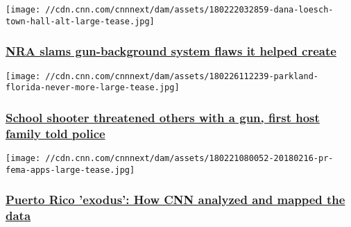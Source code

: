 \href{/2018/02/23/us/nra-criticizes-gaps-it-created-in-gun-background-system-invs/index.html}{}

\texttt{[image: //cdn.cnn.com/cnnnext/dam/assets/180222032859-dana-loesch-town-hall-alt-large-tease.jpg]}

\hypertarget{nra-slams-gun-background-system-flaws-it-helped-create}{%
\subsubsection{\texorpdfstring{\href{/2018/02/23/us/nra-criticizes-gaps-it-created-in-gun-background-system-invs/index.html}{NRA
slams gun-background system flaws it helped
create}}{NRA slams gun-background system flaws it helped create}}\label{nra-slams-gun-background-system-flaws-it-helped-create}}

\href{/2018/02/21/us/school-shooter-gun-threats-first-host-family-told-police-invs/index.html}{}

\texttt{[image: //cdn.cnn.com/cnnnext/dam/assets/180226112239-parkland-florida-never-more-large-tease.jpg]}

\hypertarget{school-shooter-threatened-others-with-a-gun-first-host-family-told-police}{%
\subsubsection{\texorpdfstring{\href{/2018/02/21/us/school-shooter-gun-threats-first-host-family-told-police-invs/index.html}{School
shooter threatened others with a gun, first host family told
police}}{School shooter threatened others with a gun, first host family told police}}\label{school-shooter-threatened-others-with-a-gun-first-host-family-told-police}}

\href{/2018/02/21/us/puerto-rico-migration-data-methodology-invs/index.html}{}

\texttt{[image: //cdn.cnn.com/cnnnext/dam/assets/180221080052-20180216-pr-fema-apps-large-tease.jpg]}

\hypertarget{puerto-rico-exodus-how-cnn-analyzed-and-mapped-the-data}{%
\subsubsection{\texorpdfstring{\href{/2018/02/21/us/puerto-rico-migration-data-methodology-invs/index.html}{Puerto
Rico 'exodus': How CNN analyzed and mapped the
data}}{Puerto Rico 'exodus': How CNN analyzed and mapped the data}}\label{puerto-rico-exodus-how-cnn-analyzed-and-mapped-the-data}}

